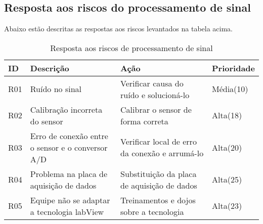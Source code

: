 \subsection{Resposta aos riscos do processamento de sinal}
Abaixo estão descritas as respostas aos riscos levantados na tabela acima.

\begin{table}[h]
    \centering
    \begin{tabular}{|p{1cm}|p{2cm}|p{4cm}|p{2cm}|}
        \hline
        \textbf{ID}  & \textbf{Descrição} & \textbf{Ação} & \textbf{Prioridade} \\ \hline
        R01 &Ruído no sinal &Verificar causa do ruído e solucioná-lo & Média(10) \\ \hline
        R02 &Calibração incorreta do sensor &Calibrar o sensor de forma correta &Alta(18) \\ \hline
        R03 &Erro de conexão entre o sensor e o conversor A/D &Verificar local de erro da conexão e arrumá-lo &Alta(20) \\ \hline
        R04 &Problema na placa de aquisição de dados &Substituição da placa de aquisição de dados &Alta(25) \\ \hline
        R05 &Equipe não se adaptar a tecnologia labView &Treinamentos e dojos sobre a tecnologia &Alta(23) \\ \hline
    \end{tabular}
\caption{Resposta aos riscos de processamento de sinal}
\end{table}